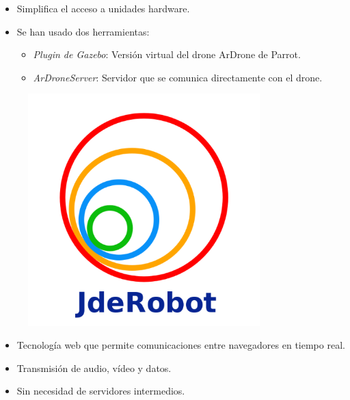 \documentclass[notes,slidesec,a4]{seminar}
\begin{document}
\begin{hslide}
\begin{minipage}[t]{0.7\textwidth}
\begin{itemize}
\item Simplifica el acceso a unidades hardware.
\item Se han usado dos herramientas:
\begin{itemize}
\item \emph{Plugin de Gazebo}: Versión virtual del drone ArDrone de Parrot.
\item \emph{ArDroneServer}: Servidor que se comunica directamente con el drone.
\end{itemize}
\end{itemize}

\end{minipage}
\begin{minipage}[t]{0.3\textwidth}
\begin{center}
\begin{figure}
\includegraphics[width=0.8\textwidth]{img/jderobot}
\end{figure}
\end{center}
\end{minipage}
\end{hslide}



\begin{hslide}
\begin{itemize}
\item Tecnología web que permite comunicaciones entre navegadores en tiempo real.
\item Transmisión de audio, vídeo y datos.
\item Sin necesidad de servidores intermedios.
\end{itemize}
\end{hslide}
\end{document}
